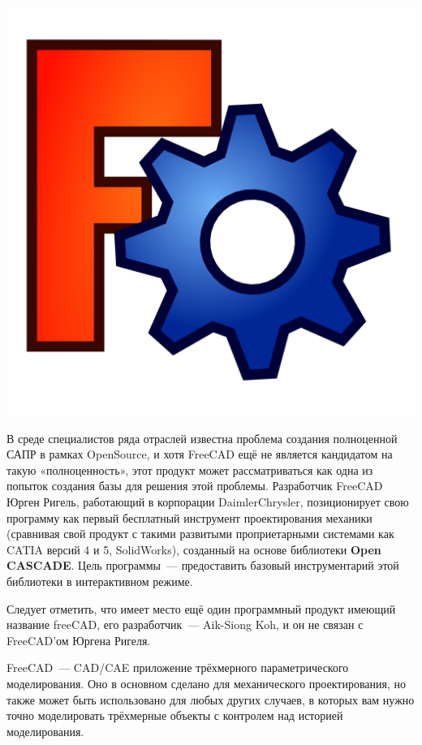 \secdown

\includegraphics[height=0.5\textheight]{logo/FreeCAD.png}

В среде специалистов ряда отраслей известна проблема создания полноценной САПР в
рамках OpenSource, и хотя FreeCAD ещё не является кандидатом на такую
«полноценность», этот продукт может рассматриваться как одна из попыток создания
базы для решения этой проблемы. Разработчик FreeCAD Юрген Ригель, работающий в
корпорации DaimlerChrysler, позиционирует свою программу как первый бесплатный
инструмент проектирования механики (сравнивая свой продукт с такими развитыми
проприетарными системами как CATIA версий 4 и 5, SolidWorks), созданный на
основе библиотеки \textbf{Open CASCADE}. Цель программы\ --- предоставить
базовый инструментарий этой библиотеки в интерактивном режиме.

Следует отметить, что имеет место ещё один программный продукт имеющий название
freeCAD, его разработчик\ --- Aik-Siong Koh, и он не связан с FreeCAD’ом Юргена
Ригеля.

\bigskip{}
FreeCAD\ --- CAD/CAE приложение трёхмерного параметрического моделирования.
Оно в основном сделано для механического проектирования, но также может быть
использовано для любых других случаев, в которых вам нужно точно моделировать
трёхмерные объекты с контролем над историей моделирования.

